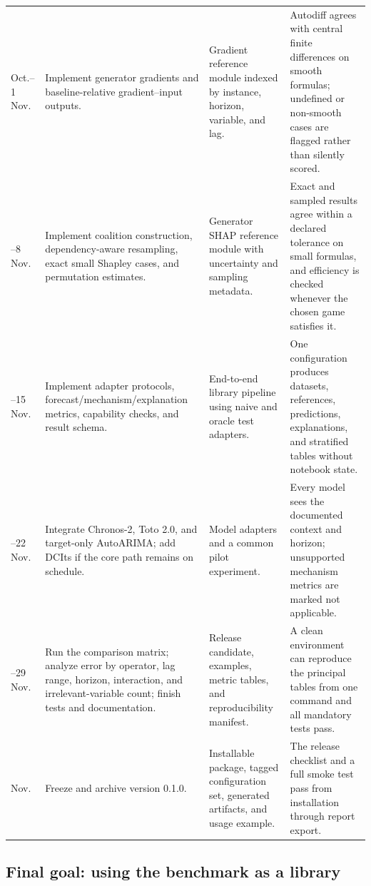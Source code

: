 \begin{longtable}{@{}
>{\raggedright\arraybackslash}p{}
>{\raggedright\arraybackslash}p{}
>{\raggedright\arraybackslash}p{}
>{\raggedright\arraybackslash}p{}@{}}
26 Oct.--1 Nov. &
Implement generator gradients and baseline-relative gradient--input outputs. &
Gradient reference module indexed by instance, horizon, variable, and lag. &
Autodiff agrees with central finite differences on smooth formulas; undefined
or non-smooth cases are flagged rather than silently scored. \\

2--8 Nov. &
Implement coalition construction, dependency-aware resampling, exact small
Shapley cases, and permutation estimates. &
Generator SHAP reference module with uncertainty and sampling metadata. &
Exact and sampled results agree within a declared tolerance on small formulas,
and efficiency is checked whenever the chosen game satisfies it. \\

9--15 Nov. &
Implement adapter protocols, forecast/mechanism/explanation metrics, capability
checks, and result schema. &
End-to-end library pipeline using naive and oracle test adapters. &
One configuration produces datasets, references, predictions, explanations,
and stratified tables without notebook state. \\

16--22 Nov. &
Integrate Chronos-2, Toto 2.0, and target-only AutoARIMA; add DCIts if the core
path remains on schedule. &
Model adapters and a common pilot experiment. &
Every model sees the documented context and horizon; unsupported mechanism
metrics are marked not applicable. \\

23--29 Nov. &
Run the comparison matrix; analyze error by operator, lag range, horizon,
interaction, and irrelevant-variable count; finish tests and documentation. &
Release candidate, examples, metric tables, and reproducibility manifest. &
A clean environment can reproduce the principal tables from one command and
all mandatory tests pass. \\

30 Nov. &
Freeze and archive version 0.1.0. &
Installable package, tagged configuration set, generated artifacts, and usage
example. &
The release checklist and a full smoke test pass from installation through
report export. \\
\end{longtable}
\endgroup

\subsection{Final goal: using the benchmark as a library}

